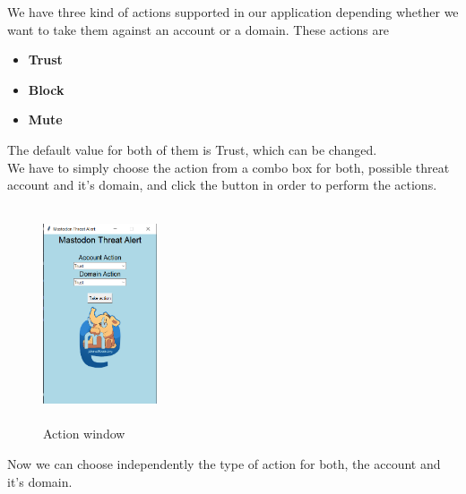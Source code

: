 We have three kind of actions supported in our application depending whether
we want to take them against an account or a domain. These actions are
\begin{itemize}
	\item \textbf{Trust}
	\item \textbf{Block}
	\item \textbf{Mute}
\end{itemize}
The default value for both of them is Trust,  which can be changed.
\\[5pt]
We have to simply choose the action from a combo box for both, possible threat account and
it's domain, and click the button in order to perform the actions. 
\begin{figure}[H]
	\centering
	\includegraphics[width=0.3\textwidth,height=240px]{images/actionspage.png}
	\caption{Action window}
	\label{fig:action_page}
\end{figure}
Now we can choose independently the type of action for both, the account
and it's domain.
\\[5pt]
